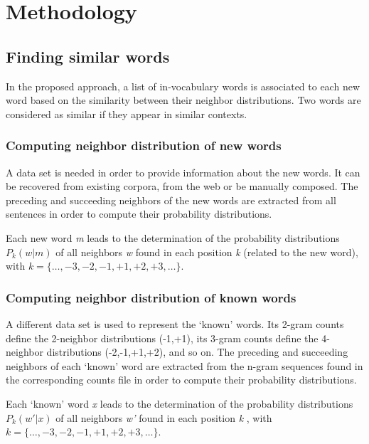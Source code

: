 \documentclass[conference]{IEEEtran}
\begin{document}
\section{Methodology}



\subsection{Finding similar words}

In the proposed approach, a list of in-vocabulary words is associated to each new word based on the similarity between their neighbor distributions. Two words are considered as similar if they appear in similar contexts.

\subsubsection{Computing neighbor distribution of new words}

A data set is needed in order to provide information about the new words.
It can be recovered from existing corpora, from the web or be manually composed. 
The preceding and succeeding neighbors of the new words are extracted from all sentences in order to compute their probability distributions. 

Each new word \textit{m} leads to the determination of the probability distributions $P_{k}(w|m)$ of all neighbors \textit{w} found in each position \textit{k} (related to the new word), with $k=\{\ldots,-3,-2,-1,+1,+2,+3,\ldots\}$.

\subsubsection{Computing neighbor distribution of known words}

A different data set is used to represent the `known' words. Its 2-gram counts define the 2-neighbor distributions (-1,+1), its 3-gram counts define the 4-neighbor distributions (-2,-1,+1,+2), and so on.
The preceding and succeeding neighbors of each `known' word are extracted from the n-gram sequences found in the corresponding counts file in order to compute their probability distributions.

Each `known' word \textit{x} leads to the determination of the probability distributions $P_{k}(w'|x)$ of all neighbors \textit{w'} found in each position \textit{k} , with $k=\{\ldots,-3,-2,-1,+1,+2,+3,\ldots\}$.
 
\end{document}
